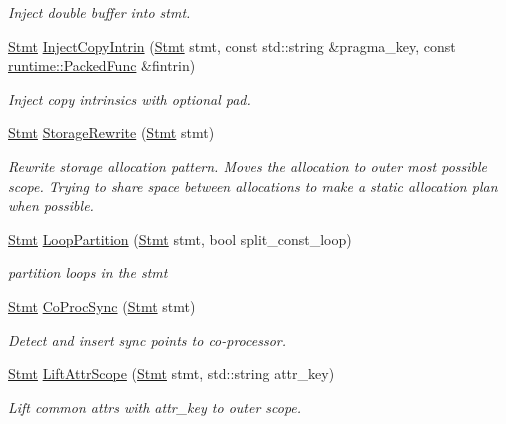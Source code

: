 \begin{DoxyCompactItemize}
\begin{DoxyCompactList}\small\item\em Inject double buffer into stmt. \end{DoxyCompactList}\item 
\hyperlink{classtvm_1_1tir_1_1Stmt}{Stmt} \hyperlink{namespacetvm_1_1tir_a3550907081d6332c5a4b0849e1948c79}{Inject\+Copy\+Intrin} (\hyperlink{classtvm_1_1tir_1_1Stmt}{Stmt} stmt, const std\+::string \&pragma\+\_\+key, const \hyperlink{classtvm_1_1runtime_1_1PackedFunc}{runtime\+::\+Packed\+Func} \&fintrin)
\begin{DoxyCompactList}\small\item\em Inject copy intrinsics with optional pad. \end{DoxyCompactList}\item 
\hyperlink{classtvm_1_1tir_1_1Stmt}{Stmt} \hyperlink{namespacetvm_1_1tir_a5b70ca88f988211332570160c82e3026}{Storage\+Rewrite} (\hyperlink{classtvm_1_1tir_1_1Stmt}{Stmt} stmt)
\begin{DoxyCompactList}\small\item\em Rewrite storage allocation pattern. Moves the allocation to outer most possible scope. Trying to share space between allocations to make a static allocation plan when possible. \end{DoxyCompactList}\item 
\hyperlink{classtvm_1_1tir_1_1Stmt}{Stmt} \hyperlink{namespacetvm_1_1tir_ae0606ab38faf2f31d42759f217fdec93}{Loop\+Partition} (\hyperlink{classtvm_1_1tir_1_1Stmt}{Stmt} stmt, bool split\+\_\+const\+\_\+loop)
\begin{DoxyCompactList}\small\item\em partition loops in the stmt \end{DoxyCompactList}\item 
\hyperlink{classtvm_1_1tir_1_1Stmt}{Stmt} \hyperlink{namespacetvm_1_1tir_a9a890acc3681867fe74ad2207d17278f}{Co\+Proc\+Sync} (\hyperlink{classtvm_1_1tir_1_1Stmt}{Stmt} stmt)
\begin{DoxyCompactList}\small\item\em Detect and insert sync points to co-\/processor. \end{DoxyCompactList}\item 
\hyperlink{classtvm_1_1tir_1_1Stmt}{Stmt} \hyperlink{namespacetvm_1_1tir_a799dff4f3a280576d6838694c151e657}{Lift\+Attr\+Scope} (\hyperlink{classtvm_1_1tir_1_1Stmt}{Stmt} stmt, std\+::string attr\+\_\+key)
\begin{DoxyCompactList}\small\item\em Lift common attrs with attr\+\_\+key to outer scope. \end{DoxyCompactList}\item 

\end{DoxyCompactItemize}
